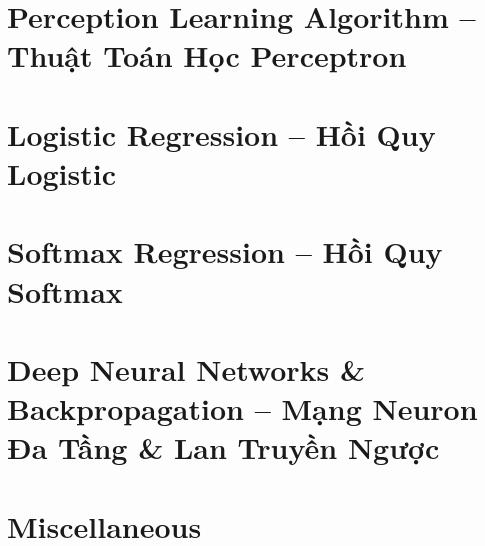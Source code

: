 \documentclass{article}
\begin{document}
\section{Perception Learning Algorithm -- Thuật Toán Học Perceptron}


\section{Logistic Regression -- Hồi Quy Logistic}


\section{Softmax Regression -- Hồi Quy Softmax}


\section{Deep Neural Networks \& Backpropagation -- Mạng Neuron Đa Tầng \& Lan Truyền Ngược}


\section{Miscellaneous}


\printbibliography[heading=bibintoc]
	
\end{document}
